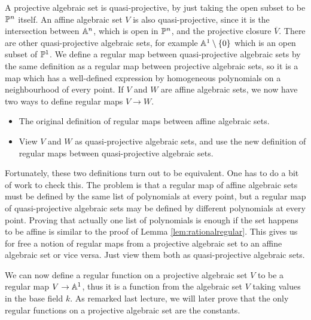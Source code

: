 A projective algebraic set is quasi-projective, by just taking the open subset to be $ \PP^n $ itself. An affine algebraic set $ V $ is also quasi-projective, since it is the intersection between $ \AA^n $, which is open in $ \PP^n $, and the projective closure $ \overline{V} $. There are other quasi-projective algebraic sets, for example $ \AA^1 \setminus \cbr{0} $ which is an open subset of $ \PP^1 $. We define a regular map between quasi-projective algebraic sets by the same definition as a regular map between projective algebraic sets, so it is a map which has a well-defined expression by homogeneous polynomials on a neighbourhood of every point. If $ V $ and $ W $ are affine algebraic sets, we now have two ways to define regular maps $ V \to W $.
\begin{itemize}
\item The original definition of regular maps between affine algebraic sets.
\item View $ V $ and $ W $ as quasi-projective algebraic sets, and use the new definition of regular maps between quasi-projective algebraic sets.
\end{itemize}
Fortunately, these two definitions turn out to be equivalent. One has to do a bit of work to check this. The problem is that a regular map of affine algebraic sets must be defined by the same list of polynomials at every point, but a regular map of quasi-projective algebraic sets may be defined by different polynomials at every point. Proving that actually one list of polynomials is enough if the set happens to be affine is similar to the proof of Lemma \ref{lem:rationalregular}. This gives us for free a notion of regular maps from a projective algebraic set to an affine algebraic set or vice versa. Just view them both as quasi-projective algebraic sets.

\pagebreak

\begin{example*}
We can now define a regular function on a projective algebraic set $ V $ to be a regular map $ V \to \AA^1 $, thus it is a function from the algebraic set $ V $ taking values in the base field $ k $. As remarked last lecture, we will later prove that the only regular functions on a projective algebraic set are the constants.
\end{example*}

